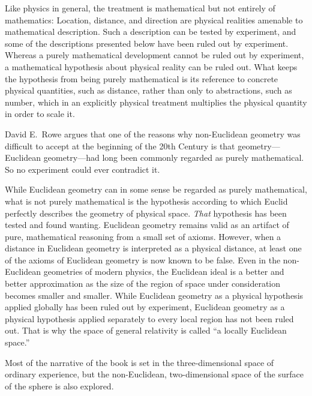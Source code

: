 Like physics in general, the treatment is mathematical but not entirely of
mathematics: Location, distance, and direction are physical realities amenable
to mathematical description. Such a description can be tested by experiment,
and some of the descriptions presented below have been ruled out by
experiment.
Whereas a purely mathematical development cannot be ruled out by experiment, a
mathematical hypothesis about physical reality can be ruled out.  What keeps
the hypothesis from being purely mathematical is its reference to concrete
physical quantities, such as distance, rather than only to abstractions, such
as number, which in an explicitly physical treatment multiplies the physical
quantity in order to scale it.

David E.~Rowe\cite{Rowe2006} argues that one of the reasons why non-Euclidean
geometry was difficult to accept at the beginning of the 20th Century is that
geometry---Euclidean geometry---had long been commonly regarded as purely
mathematical.  So no experiment could ever contradict it.

While Euclidean geometry can in some sense be regarded as purely mathematical,
what is not purely mathematical is the hypothesis according to which Euclid
perfectly describes the geometry of physical space.  \emph{That} hypothesis has
been tested and found wanting.  Euclidean geometry remains valid as an artifact
of pure, mathematical reasoning from a small set of axioms.  However, when a
distance in Euclidean geometry is interpreted as a physical distance, at least
one of the axioms of Euclidean geometry is now known to be false.  Even in the
non-Euclidean geometries of modern physics, the Euclidean ideal is a better and
better approximation as the size of the region of space under consideration
becomes smaller and smaller.  While Euclidean geometry as a physical hypothesis
applied globally has been ruled out by experiment, Euclidean geometry as a
physical hypothesis applied separately to every local region has not been ruled
out.  That is why the space of general relativity is called ``a locally
Euclidean space.''

Most of the narrative of the book is set in the three-dimensional space of
ordinary experience, but the non-Euclidean, two-dimensional space of the
surface of the sphere is also explored.

